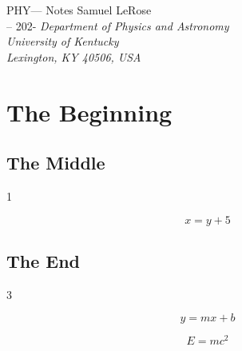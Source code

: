 \documentclass[12pt]{article}
\newcommand{\name}{Samuel LeRose}              %
\newcommand{\semester}{-- 202-}        %
\newcommand{\hwTitle}{PHY--- Notes}  %
\begin{document}
\begin{titlepage}
\begin{center}
    \vspace*{1.5in}
    {\Large{\hwTitle}}
    \vskip 0.25in \name\\
    \semester
    \vskip 0.25in {\it Department of Physics and Astronomy\\ University of Kentucky\\ Lexington, KY 40506, USA}
\end{center}
\vskip 0.5in
\end{titlepage}


\chapter{The Beginning}

\section{The Middle}{1}

\lipsum[1]

\begin{equation}
    x=y+5
\end{equation}

\section{The End}{3}

\lipsum[2]

\begin{equation}
    y=mx+b
\end{equation}

\begin{equation}
    E=mc^2
\end{equation}
\end{document}
